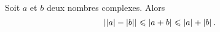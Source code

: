 \documentclass{magnolia}
\begin{document}

\begin{proposition}[utile=-3,nom={Seconde inégalité triangulaire}]
Soit $a$ et $b$ deux nombres complexes. Alors
\[\left|\left|a\right|-\left|b\right|\right|\leqslant\left|a+b\right|\leqslant\left|a\right|+\left|b\right|.\]  
\end{proposition}
\end{document}

